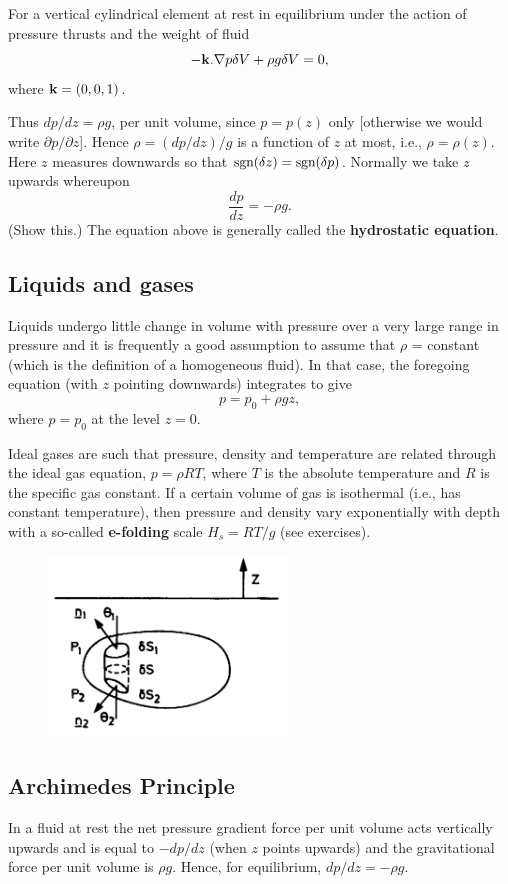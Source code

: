 \documentclass[twoside,a4paper,11pt]{report}
\begin{document}
For a vertical cylindrical element at rest in equilibrium under the action 
of pressure thrusts and the weight of fluid
\[-{{\bf k}}. \nabla p\delta V+\rho g\delta 
V=0,\]
 where ${{\bf k}}=(0,0,1)$.

Thus ${dp}/{dz}=\rho g$, per unit volume, since $p = 
p(z)$ only [otherwise we would write $\partial p/\partial z$].
Hence $\rho ={\left( {{dp}/ {dz}} \right)} / g$ is a function of $z$ at most, i.e., $\rho  = 
\rho (z)$. Here $z$ measures downwards so that $\hbox{sgn} (\delta z) = \hbox{sgn} 
(\delta p)$. Normally we take $z$ upwards whereupon
\[
\frac{dp}{dz}=-\rho g.
\]
(Show this.) The equation above is generally called the \textbf{hydrostatic 
equation}.

\subsection{Liquids and gases}
Liquids undergo little change in volume with pressure over a very large 
range in pressure and it is frequently a good assumption to assume that 
$\rho $ = constant (which is the definition of a homogeneous fluid). In that 
case, the foregoing equation (with $z$ pointing downwards) integrates to give
\[
p=p_0 +\rho gz ,
\]
where $p = p_{0}$ at the level $z = 0$.

Ideal gases are such that pressure, density and temperature are related 
through the ideal gas equation, $p = \rho RT$, where $T$ is the absolute 
temperature and $R$ is the specific gas constant. If a certain volume of gas 
is isothermal (i.e., has constant temperature), then pressure and density 
vary exponentially with depth with a so-called \textbf{e-folding} scale 
$H_{s} = RT/g$ (see exercises).

\begin{figure}
\centerline{\includegraphics[width=2.5in]{Section28.pdf}}
\label{fig8}
\end{figure}

\subsection{Archimedes Principle}
In a fluid at rest the net pressure gradient force per unit volume acts 
vertically upwards and is equal to $-dp/dz$ (when $z$ points upwards) and the 
gravitational force per unit volume is $\rho g$. Hence, for equilibrium, 
$dp/dz = -\rho g$. 
\end{document}
